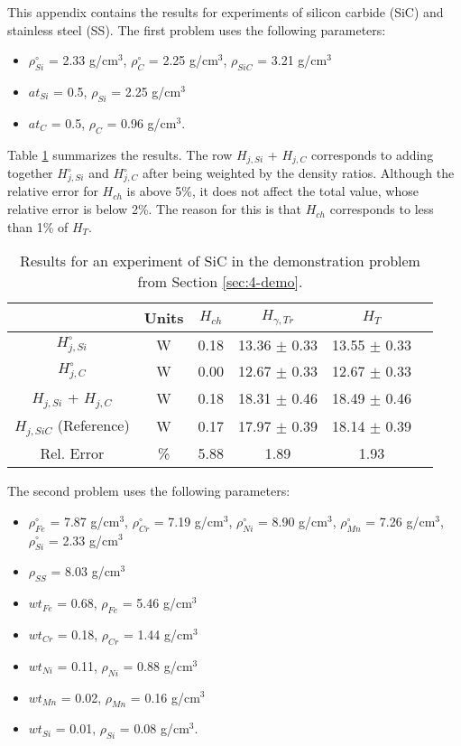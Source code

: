 \label{ap:nuc_heating}

This appendix contains the results for experiments of silicon carbide (SiC) and stainless steel (SS).
The first problem uses the following parameters:
\begin{itemize}
  \item $\rho^\circ_{Si}$ = 2.33 g/cm$^3$, $\rho^\circ_{C}$ = 2.25 g/cm$^3$, $\rho_{SiC}$ = 3.21 g/cm$^3$
  \item $at_{Si}$ = 0.5, $\rho_{Si}$ = 2.25 g/cm$^3$
  \item $at_{C}$ = 0.5, $\rho_{C}$ = 0.96 g/cm$^3$.
\end{itemize}

Table \ref{tab:res-sic} summarizes the results.
The row $H_{j,Si}$ + $H_{j,C}$ corresponds to adding together $H^\circ_{j,Si}$ and $H^\circ_{j,C}$ after being weighted by the density ratios.
Although the relative error for $H_{ch}$ is above 5\%, it does not affect the total value, whose relative error is below 2\%.
The reason for this is that $H_{ch}$ corresponds to less than 1\% of $H_T$.

\begin{table}[htbp!]
  \centering
  \caption{Results for an experiment of SiC in the demonstration problem from Section \ref{sec:4-demo}.}
  \label{tab:res-sic}
  \begin{tabular}{cccccc}
    \toprule
                              & Units & $H_{ch}$ & $H_{\gamma, Tr}$ & $H_{T}$          \\
    \midrule
    $H^\circ_{j,Si}$          & W     & 0.18     & 13.36 $\pm$ 0.33 & 13.55 $\pm$ 0.33 \\
    $H^\circ_{j,C}$           & W     & 0.00     & 12.67 $\pm$ 0.33 & 12.67 $\pm$ 0.33 \\
    $H_{j,Si}$ + $H_{j,C}$    & W     & 0.18     & 18.31 $\pm$ 0.46 & 18.49 $\pm$ 0.46 \\
    $H_{j,SiC}$ (Reference)   & W     & 0.17     & 17.97 $\pm$ 0.39 & 18.14 $\pm$ 0.39 \\
    Rel. Error                & \%    & 5.88     & 1.89             & 1.93             \\
    \bottomrule
  \end{tabular}
\end{table}

The second problem uses the following parameters:
\begin{itemize}
  \item $\rho^\circ_{Fe}$ = 7.87 g/cm$^3$, $\rho^\circ_{Cr}$ = 7.19 g/cm$^3$, $\rho^\circ_{Ni}$ = 8.90 g/cm$^3$, $\rho^\circ_{Mn}$ = 7.26 g/cm$^3$, $\rho^\circ_{Si}$ = 2.33 g/cm$^3$
  \item $\rho_{SS}$ = 8.03 g/cm$^3$
  \item $wt_{Fe}$ = 0.68, $\rho_{Fe}$ = 5.46 g/cm$^3$
  \item $wt_{Cr}$ = 0.18, $\rho_{Cr}$ = 1.44 g/cm$^3$
  \item $wt_{Ni}$ = 0.11, $\rho_{Ni}$ = 0.88 g/cm$^3$
  \item $wt_{Mn}$ = 0.02, $\rho_{Mn}$ = 0.16 g/cm$^3$
  \item $wt_{Si}$ = 0.01, $\rho_{Si}$ = 0.08 g/cm$^3$.
\end{itemize}

